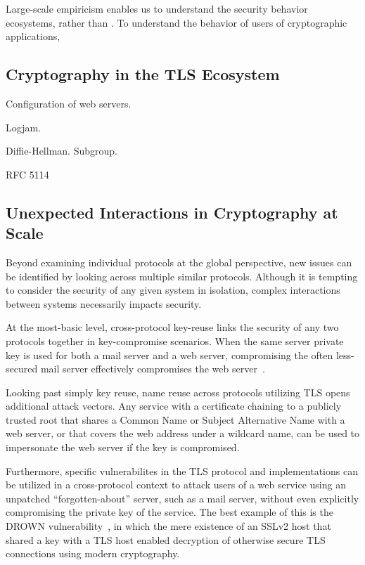 Large-scale empiricism enables us to understand the security behavior
ecosystems, rather than \TK. To understand the behavior of users of cryptographic applications, 

\subsection{Cryptography in the TLS Ecosystem}

Configuration of web servers.

Logjam.

Diffie-Hellman. Subgroup.

RFC 5114

\subsection{Unexpected Interactions in Cryptography at Scale}

Beyond examining individual protocols at the global perspective, new issues can
be identified by looking across multiple similar protocols. Although it is
tempting to consider the security of any given system in isolation, complex
interactions between systems necessarily impacts security.

At the most-basic level, cross-protocol key-reuse links the security of any two
protocols together in key-compromise scenarios. When the same server private
key is used for both a mail server and a web server, compromising the often
less-secured mail server effectively compromises the web
server~\cite{mail-2015}.

Looking past simply key reuse, name reuse across protocols utilizing TLS opens
additional attack vectors. Any service with a certificate chaining to a
publicly trusted root that shares a Common Name or Subject Alternative Name
with a web server, or that covers the web address under a wildcard name, can be
used to impersonate the web server if the key is compromised.

Furthermore, specific vulnerabilites in the TLS protocol and implementations
can be utilized in a cross-protocol context to attack users of a web service
using an unpatched ``forgotten-about'' server, such as a mail server, without
even explicitly compromising the private key of the service. The best example
of this is the DROWN vulnerability~\cite{drown-2016}, in which the mere
existence of an SSLv2 host that shared a key with a TLS host enabled decryption
of otherwise secure TLS connections using modern cryptography.

